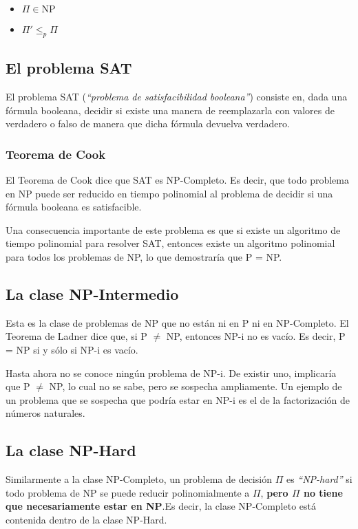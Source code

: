 \begin{itemize}
\item $\Pi \in \textrm{NP}$
\item $\Pi' \leq_p \Pi$
\end{itemize} 

\subsection{El problema SAT}

El problema SAT (\emph{``problema de satisfacibilidad booleana''}) consiste en, dada una f\'ormula booleana, decidir si existe una manera de reemplazarla con valores de verdadero o falso de manera que dicha f\'ormula devuelva verdadero.

\subsubsection{Teorema de Cook}

El Teorema de Cook dice que SAT es NP-Completo. Es decir, que todo problema en NP puede ser reducido en tiempo polinomial al problema de decidir si una f\'ormula booleana es satisfacible.

Una consecuencia importante de este problema es que si existe un algoritmo de tiempo polinomial para resolver SAT, entonces existe un algoritmo polinomial para todos los problemas de NP, lo que demostrar\'ia que P = NP.

\newpage
\subsection{La clase NP-Intermedio}

Esta es la clase de problemas de NP que no est\'an ni en P ni en NP-Completo. El Teorema de Ladner dice que, si P $\neq$ NP, entonces NP-i no es vac\'io. Es decir, P = NP si y s\'olo si NP-i es vac\'io.

Hasta ahora no se conoce ning\'un problema de NP-i. De existir uno, implicar\'ia que P $\neq$ NP, lo cual no se sabe, pero se sospecha ampliamente. Un ejemplo de un problema que se sospecha que podr\'ia estar en NP-i es el de la factorizaci\'on de n\'umeros naturales.

\subsection{La clase NP-Hard}

Similarmente a la clase NP-Completo, un problema de decisi\'on $\Pi$ es \emph{``NP-hard''} si todo problema de NP se puede reducir polinomialmente a $\Pi$, \textbf{pero $\Pi$ no tiene que necesariamente estar en NP}.Es decir, la clase NP-Completo est\'a contenida dentro de la clase NP-Hard. 

